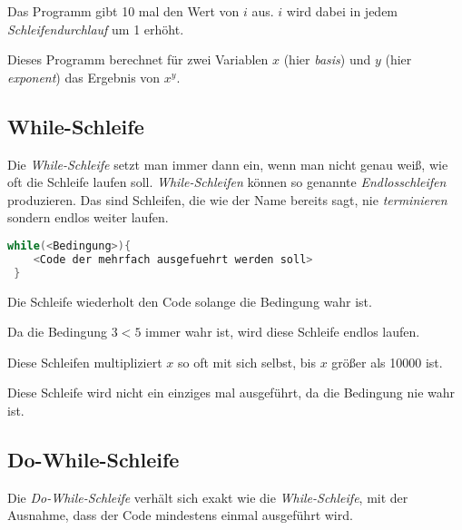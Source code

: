 \documentclass[c_worksheet.tex]{subfiles}
\begin{document}
 

Das Programm gibt 10 mal den Wert von \(i\) aus. \(i\) wird dabei in jedem \emph{Schleifendurchlauf} um 1 erhöht.

 

Dieses Programm berechnet für zwei Variablen \(x\) (hier \emph{basis}) und \(y\) (hier \emph{exponent}) das Ergebnis von \(x^y\).


\subsection{While-Schleife}

Die \emph{While-Schleife} setzt man immer dann ein, wenn man nicht genau weiß, wie oft die Schleife laufen soll. \emph{While-Schleifen} können so genannte \emph{Endlosschleifen} produzieren. Das sind Schleifen, die wie der Name bereits sagt, nie \emph{terminieren} sondern endlos weiter laufen.

\begin{lstlisting}[language=c]
 while(<Bedingung>){
 	<Code der mehrfach ausgefuehrt werden soll>
 }
 \end{lstlisting}

 Die Schleife wiederholt den Code solange die Bedingung wahr ist.

  

 Da die Bedingung \( 3 < 5 \) immer wahr ist, wird diese Schleife endlos laufen.

  

 Diese Schleifen multipliziert \(x\) so oft mit sich selbst, bis \(x\) größer als 10000 ist.

 

Diese Schleife wird nicht ein einziges mal ausgeführt, da die Bedingung nie wahr ist.



\subsection{Do-While-Schleife}

Die \emph{Do-While-Schleife} verhält sich exakt wie die \emph{While-Schleife}, mit der Ausnahme, dass der Code mindestens einmal ausgeführt wird.
\end{document}
